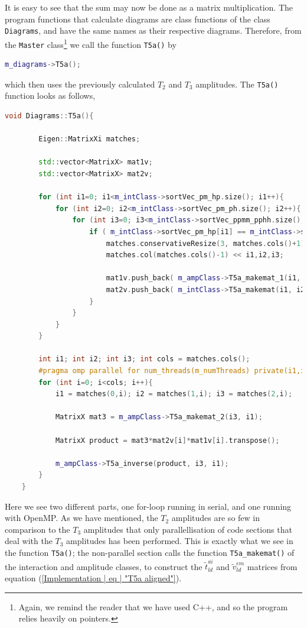 \documentclass[10pt,twoside]{report}
\begin{document}
	It is easy to see that the sum may now be done as a matrix multiplication. The program functions that calculate diagrams are class functions of the class \texttt{Diagrams}, and have the same names as their respective diagrams. Therefore, from the \texttt{Master} class\footnote{Again, we remind the reader that we have used C++, and so the program relies heavily on pointers.} we call the function \texttt{T5a()} by
	
	\begin{lstlisting}[language=C++]
	m_diagrams->T5a();
	\end{lstlisting}
	
	which then uses the previously calculated $T_2$ and $T_3$ amplitudes. The \texttt{T5a()} function looks as follows,
	
	\newpage
	\begin{lstlisting}[language=C++]
	void Diagrams::T5a(){
	
		Eigen::MatrixXi matches;
	
		std::vector<MatrixX> mat1v;
		std::vector<MatrixX> mat2v;
	
		for (int i1=0; i1<m_intClass->sortVec_pm_hp.size(); i1++){
			for (int i2=0; i2<m_intClass->sortVec_pm_ph.size(); i2++){
				for (int i3=0; i3<m_intClass->sortVec_ppmm_pphh.size(); i3++){
					if ( m_intClass->sortVec_pm_hp[i1] == m_intClass->sortVec_ppmm_pphh[i3] && m_intClass->sortVec_pm_hp[i1] == m_intClass->sortVec_pm_ph[i2]){
						matches.conservativeResize(3, matches.cols()+1);
						matches.col(matches.cols()-1) << i1,i2,i3;
	
						mat1v.push_back( m_ampClass->T5a_makemat_1(i1, i2) );
						mat2v.push_back( m_intClass->T5a_makemat(i1, i2) );
					}
				}
			}
		}
	
		int i1; int i2; int i3; int cols = matches.cols();
		#pragma omp parallel for num_threads(m_numThreads) private(i1,i2,i3) firstprivate(cols)
		for (int i=0; i<cols; i++){
			i1 = matches(0,i); i2 = matches(1,i); i3 = matches(2,i);
	
			MatrixX mat3 = m_ampClass->T5a_makemat_2(i3, i1);
	
			MatrixX product = mat3*mat2v[i]*mat1v[i].transpose();
	
			m_ampClass->T5a_inverse(product, i3, i1);
		}
	}
	\end{lstlisting}
	
	Here we see two different parts, one for-loop running in serial, and one running with OpenMP. As we have mentioned, the $T_2$ amplitudes are so few in comparison to the $T_3$ amplitudes that only parallellisation of code sections that deal with the $T_3$ amplitudes has been performed. This is exactly what we see in the function \texttt{T5a()}; the non-parallel section calls the function \texttt{T5a\_makemat()} of the interaction and amplitude classes, to construct the $\tilde{t}_{ld}^{ai}$ and $\tilde{v}_{ld}^{em}$ matrices from equation (\ref{Implementation | eq | "T5a aligned"}).\\
	
\end{document}
